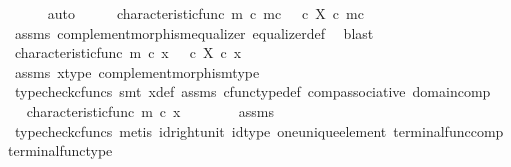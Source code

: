 \begin{isabellebody}
\ \ \ \ \isamarkupfalse%
\ auto\isanewline
\ \ \isamarkupfalse%
\ \isamarkupfalse%
\ {\isachardoublequoteopen}characteristic{\isacharunderscore}{\kern0pt}func\ m\ {\isasymcirc}\isactrlsub c\ m\isactrlsup c\ {\isacharequal}{\kern0pt}\ {\isacharparenleft}{\kern0pt}{\isasymf}\ {\isasymcirc}\isactrlsub c\ {\isasymbeta}\isactrlbsub X\isactrlesub {\isacharparenright}{\kern0pt}\ {\isasymcirc}\isactrlsub c\ m\isactrlsup c{\isachardoublequoteclose}\isanewline
\ \ \ \ \isamarkupfalse%
\ assms\ complement{\isacharunderscore}{\kern0pt}morphism{\isacharunderscore}{\kern0pt}equalizer\ equalizer{\isacharunderscore}{\kern0pt}def\ \isamarkupfalse%
\ blast\isanewline
\ \ \isamarkupfalse%
\ \isamarkupfalse%
\ {\isachardoublequoteopen}characteristic{\isacharunderscore}{\kern0pt}func\ m\ {\isasymcirc}\isactrlsub c\ x\ {\isacharequal}{\kern0pt}\ {\isasymf}\ {\isasymcirc}\isactrlsub c\ {\isasymbeta}\isactrlbsub X\isactrlesub \ {\isasymcirc}\isactrlsub c\ x{\isachardoublequoteclose}\isanewline
\ \ \ \ \isamarkupfalse%
\ assms\ x{\isacharprime}{\kern0pt}{\isacharunderscore}{\kern0pt}type\ complement{\isacharunderscore}{\kern0pt}morphism{\isacharunderscore}{\kern0pt}type\isanewline
\ \ \ \ \isamarkupfalse%
\ {\isacharparenleft}{\kern0pt}typecheck{\isacharunderscore}{\kern0pt}cfuncs{\isacharcomma}{\kern0pt}\ smt\ x{\isacharprime}{\kern0pt}{\isacharunderscore}{\kern0pt}def\ assms\ cfunc{\isacharunderscore}{\kern0pt}type{\isacharunderscore}{\kern0pt}def\ comp{\isacharunderscore}{\kern0pt}associative\ domain{\isacharunderscore}{\kern0pt}comp{\isacharparenright}{\kern0pt}\isanewline
\ \ \isamarkupfalse%
\ \isamarkupfalse%
\ {\isachardoublequoteopen}characteristic{\isacharunderscore}{\kern0pt}func\ m\ {\isasymcirc}\isactrlsub c\ x\ {\isacharequal}{\kern0pt}\ {\isasymf}{\isachardoublequoteclose}\isanewline
\ \ \ \ \isamarkupfalse%
\ assms\ \isamarkupfalse%
\ {\isacharparenleft}{\kern0pt}typecheck{\isacharunderscore}{\kern0pt}cfuncs{\isacharcomma}{\kern0pt}\ metis\ id{\isacharunderscore}{\kern0pt}right{\isacharunderscore}{\kern0pt}unit{}\ id{\isacharunderscore}{\kern0pt}type\ one{\isacharunderscore}{\kern0pt}unique{\isacharunderscore}{\kern0pt}element\ terminal{\isacharunderscore}{\kern0pt}func{\isacharunderscore}{\kern0pt}comp\ terminal{\isacharunderscore}{\kern0pt}func{\isacharunderscore}{\kern0pt}type{\isacharparenright}{\kern0pt}\isanewline
\ \ \isamarkupfalse%

\end{isabellebody}
